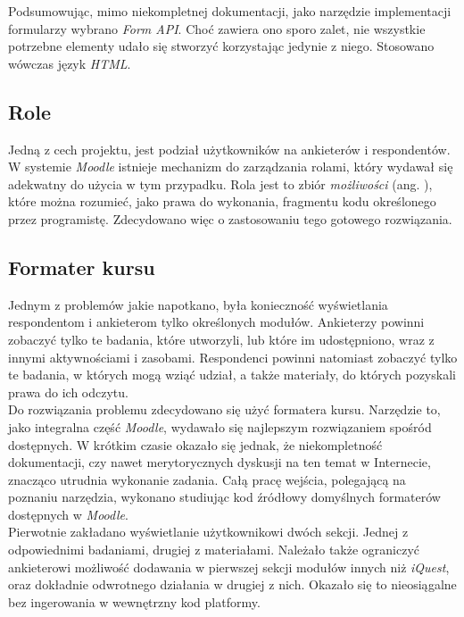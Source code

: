 Podsumowując, mimo niekompletnej dokumentacji, jako narzędzie implementacji formularzy wybrano \textit{Form API}. Choć zawiera ono sporo zalet, nie wszystkie potrzebne elementy udało się stworzyć korzystając jedynie z niego. Stosowano wówczas język \textit{HTML}. 

\subsection{Role}
\label{Chapter626}

Jedną z cech projektu, jest podział użytkowników na ankieterów i respondentów. W systemie \textit{Moodle} istnieje mechanizm do zarządzania rolami, który wydawał się adekwatny do użycia w tym przypadku. Rola jest to zbiór \textit{możliwości} (ang. ), które można rozumieć, jako prawa do wykonania, fragmentu kodu określonego przez programistę. Zdecydowano więc o zastosowaniu tego gotowego rozwiązania.

\subsection{Formater kursu}
\label{Chapter627}

Jednym z problemów jakie napotkano, była konieczność wyświetlania respondentom i ankieterom tylko określonych modułów. Ankieterzy powinni zobaczyć tylko te badania, które utworzyli, lub które im udostępniono, wraz z innymi aktywnościami i zasobami. Respondenci powinni natomiast zobaczyć tylko te badania, w których mogą wziąć udział, a także materiały, do których pozyskali prawa do ich odczytu. \\

Do rozwiązania problemu zdecydowano się użyć formatera kursu. Narzędzie to, jako integralna część \textit{Moodle}, wydawało się najlepszym rozwiązaniem spośród dostępnych. W krótkim czasie okazało się jednak, że niekompletność dokumentacji, czy nawet merytorycznych dyskusji na ten temat w Internecie, znacząco utrudnia wykonanie zadania. Całą pracę wejścia, polegającą na poznaniu narzędzia, wykonano studiując kod źródłowy domyślnych formaterów dostępnych w \textit{Moodle}. \\

Pierwotnie zakładano wyświetlanie użytkownikowi dwóch sekcji. Jednej z odpowiednimi badaniami, drugiej z materiałami. Należało także ograniczyć ankieterowi możliwość dodawania w pierwszej sekcji modułów innych niż \textit{iQuest}, oraz dokładnie odwrotnego działania w drugiej z nich. Okazało się to nieosiągalne bez ingerowania w wewnętrzny kod platformy. \\

